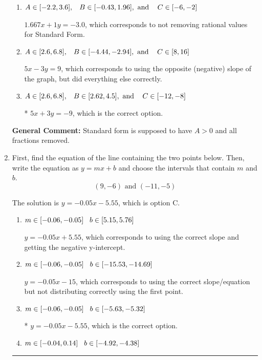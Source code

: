 \documentclass{extbook}[14pt]
\newcommand{\litem}[1]{\item #1

\rule{\textwidth}{0.4pt}}
\begin{document}
\begin{enumerate}
{\begin{enumerate}[label=\Alph*.]
 $1.667x - 1y = 3.0$, which corresponds to using the opposite (negative) slope of the graph and not removing rational values.
\item \( A \in [-2.2, 3.6], \hspace{3mm} B \in [-0.43, 1.96], \text{ and } \hspace{3mm} C \in [-6, -2] \)

 $1.667x + 1y = -3.0$, which corresponds to not removing rational values for Standard Form.
\item \( A \in [2.6, 6.8], \hspace{3mm} B \in [-4.44, -2.94], \text{ and } \hspace{3mm} C \in [8, 16] \)

 $5x - 3y = 9$, which corresponds to using the opposite (negative) slope of the graph, but did everything else correctly.
\item \( A \in [2.6, 6.8], \hspace{3mm} B \in [2.62, 4.5], \text{ and } \hspace{3mm} C \in [-12, -8] \)

* $5x + 3y = -9$, which is the correct option.
\end{enumerate}

\textbf{General Comment:} Standard form is supposed to have $A > 0$ and all fractions removed.
}
\litem{
First, find the equation of the line containing the two points below. Then, write the equation as $ y=mx+b $ and choose the intervals that contain $m$ and $b$.
\[ (9, -6) \text{ and } (-11, -5) \]

The solution is \( y = -0.05x -5.55 \), which is option C.\begin{enumerate}[label=\Alph*.]
\item \( m \in [-0.06, -0.05] \hspace*{3mm} b \in [5.15, 5.76] \)

 $y = -0.05x + 5.55$, which corresponds to using the correct slope and getting the negative y-intercept.
\item \( m \in [-0.06, -0.05] \hspace*{3mm} b \in [-15.53, -14.69] \)

 $y = -0.05x -15$, which corresponds to using the correct slope/equation but not distributing correctly using the first point.
\item \( m \in [-0.06, -0.05] \hspace*{3mm} b \in [-5.63, -5.32] \)

* $y = -0.05x -5.55$, which is the correct option.
\item \( m \in [-0.04, 0.14] \hspace*{3mm} b \in [-4.92, -4.38] \)


\end{enumerate}}
\end{enumerate}
\end{document}
